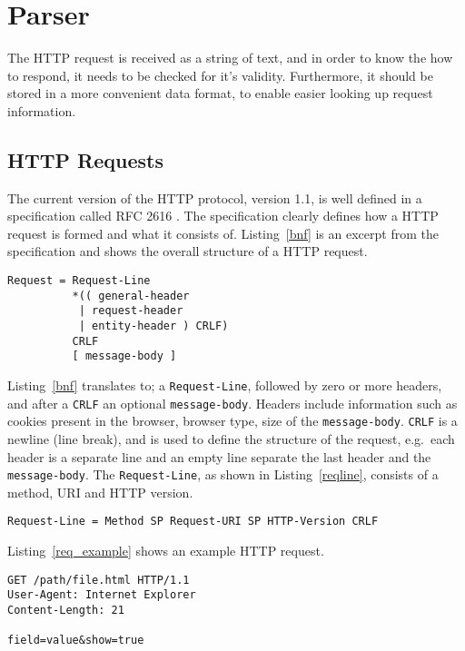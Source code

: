 \section{Parser}

The HTTP request is received as a string of text, and in order to know the how
to respond, it needs to be checked for it's validity. Furthermore, it should
be stored in a more convenient data format, to enable easier looking up
request information.

\subsection{HTTP Requests}
The current version of the HTTP protocol, version 1.1, is well defined in a
specification called RFC 2616 \cite{rfc}. The specification clearly defines how
a HTTP request is formed and what it consists of. Listing~\ref{bnf} is an
excerpt from the specification and shows the overall structure of a HTTP
request.

\bigskip
\begin{lstlisting}[label=bnf,caption=HTTP request structure]
Request = Request-Line
          *(( general-header
           | request-header
           | entity-header ) CRLF)
          CRLF
          [ message-body ]
\end{lstlisting}

Listing~\ref{bnf} translates to; a \texttt{Request-Line}, followed by zero or
more headers, and after a \texttt{CRLF} an optional \texttt{message-body}.
Headers include information such as cookies present in the browser, browser
type, size of the \texttt{message-body}. \texttt{CRLF} is a newline (line
break), and is used to define the structure of the request, e.g.\ each
header is a separate line and an empty line separate the last header and the
\texttt{message-body}. The \texttt{Request-Line}, as shown in
Listing~\ref{reqline}, consists of a method, URI and HTTP version.

\bigskip
\begin{lstlisting}[label=reqline,caption=HTTP Request-Line]
Request-Line = Method SP Request-URI SP HTTP-Version CRLF
\end{lstlisting}

Listing~\ref{req_example} shows an example HTTP request.

\bigskip
\begin{lstlisting}[label=req_example,caption=Example HTTP request]
GET /path/file.html HTTP/1.1
User-Agent: Internet Explorer
Content-Length: 21

field=value&show=true
\end{lstlisting}

